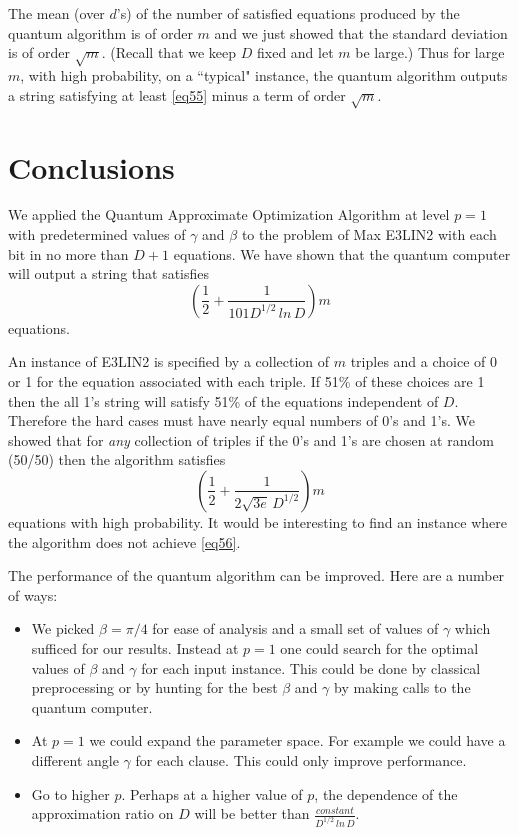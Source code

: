 \documentclass[t11pt,preprint,preprintnumbers]{revtex4}
\begin{document}
The mean (over $d$'s) of the number of satisfied equations produced by the quantum algorithm is of order $m$ and we just showed that the standard deviation is of order $\sqrt{m}$. (Recall that we keep $D$ fixed and let $m$ be large.) Thus for large $m$, with high probability, on a ``typical" instance, the quantum algorithm outputs a string satisfying at least \eqref{eq55} minus a term of order $\sqrt{m}$.
 
\section{Conclusions}
We applied the Quantum Approximate Optimization Algorithm at level $p=1$ with predetermined values of $\gamma$ and $\beta$ to the problem of Max E3LIN2 with each bit in no more than $D+1$ equations.  We have shown that the quantum computer will output a string that satisfies 
\begin{equation}
 \left(\frac{1}{2} + \frac{1}{101 D^{1/2}\, ln \, D}\right) m
\end{equation}
equations.
 
An instance of  E3LIN2 is specified by a collection of $m$ triples and a choice of 0 or 1 for the equation associated with each triple. If 51\% of these choices are 1 then the all 1's string  will satisfy 51\% of the equations independent of $D$. Therefore the hard cases must have nearly equal numbers of 0's and 1's. We showed that for {\it any} collection of triples if the 0's and 1's are chosen at random (50/50) then the algorithm satisfies 
\begin{equation}\label{eq56}
\left(\frac{1}{2}+ \frac{1}{2\sqrt{3e}\, D^{1/2}}\right) m
\end{equation}
equations with high probability. It would be interesting to find an instance where the algorithm does not achieve \eqref{eq56}.

        The performance of the quantum algorithm can be improved.  Here are a number of ways:\vspace{-1.25ex}
\begin{itemize}
\item We picked $\beta=\pi/4$ for ease of analysis and  a small set of values of $\gamma$ which sufficed for our results.  Instead at $p=1$ one could search for          the optimal values of $\beta$ and $\gamma$ for each input instance. This could be done by classical preprocessing or by hunting for the best $\beta$ and $\gamma$ by making calls to the quantum computer.
\item At $p=1$ we could expand the parameter space. For example we could have a different angle $\gamma$ for each clause. This could only                   improve performance.
\item Go to higher $p$.  Perhaps at a higher value of $p$, the dependence of the approximation ratio on $D$ will be better than $\frac{constant}{D^{1/2}\, ln \, D}$. 
\end{itemize}
\end{document}
